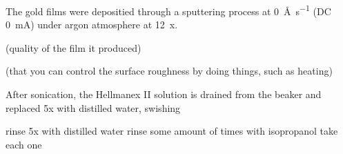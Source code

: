 The gold films were depositied through a sputtering process at
\SI{0}{\angstrom\per\second} (DC \SI{0}{\milli\ampere}) under argon
atmosphere at \SI{12}{x}.

(quality of the film it produced)

(that you can control the surface roughness by doing things, such as
heating)


After sonication, the Hellmanex II solution is drained from the beaker and
replaced 5x with distilled water, swishing

rinse 5x with distilled water
rinse some amount of times with isopropanol
take each one


